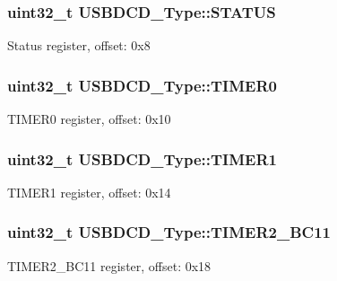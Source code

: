 \subsubsection[{\texorpdfstring{S\+T\+A\+T\+US}{STATUS}}]{ uint32\+\_\+t U\+S\+B\+D\+C\+D\+\_\+\+Type\+::\+S\+T\+A\+T\+US}\hypertarget{structUSBDCD__Type_a47a8d16e5cafbe66cf4fc40e26f286f1}{}\label{structUSBDCD__Type_a47a8d16e5cafbe66cf4fc40e26f286f1}
Status register, offset\+: 0x8 
\subsubsection[{\texorpdfstring{T\+I\+M\+E\+R0}{TIMER0}}]{ uint32\+\_\+t U\+S\+B\+D\+C\+D\+\_\+\+Type\+::\+T\+I\+M\+E\+R0}\hypertarget{structUSBDCD__Type_a6e328c4cd993e55a0d0f2ed2c0405c72}{}\label{structUSBDCD__Type_a6e328c4cd993e55a0d0f2ed2c0405c72}
T\+I\+M\+E\+R0 register, offset\+: 0x10 
\subsubsection[{\texorpdfstring{T\+I\+M\+E\+R1}{TIMER1}}]{ uint32\+\_\+t U\+S\+B\+D\+C\+D\+\_\+\+Type\+::\+T\+I\+M\+E\+R1}\hypertarget{structUSBDCD__Type_a6e397d8b8cca49e7b0742538144e4d15}{}\label{structUSBDCD__Type_a6e397d8b8cca49e7b0742538144e4d15}
T\+I\+M\+E\+R1 register, offset\+: 0x14 
\subsubsection[{\texorpdfstring{T\+I\+M\+E\+R2\+\_\+\+B\+C11}{TIMER2_BC11}}]{ uint32\+\_\+t U\+S\+B\+D\+C\+D\+\_\+\+Type\+::\+T\+I\+M\+E\+R2\+\_\+\+B\+C11}\hypertarget{structUSBDCD__Type_acf2614fc5d64ffb02c2b6551a4cfcd2a}{}\label{structUSBDCD__Type_acf2614fc5d64ffb02c2b6551a4cfcd2a}
T\+I\+M\+E\+R2\+\_\+\+B\+C11 register, offset\+: 0x18 
